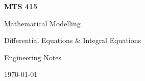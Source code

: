\documentclass[12pt, a4paper]{book}
\newcommand{\subjectcode}{MTS 415}
\newcommand{\subjecttitle}{Mathematical Modelling}
\newcommand{\subjectsubtitle}{Differential Equations \& Integral Equations}
\begin{document}
\begin{titlepage}
  \centering
  \vspace*{3cm}
  {\Huge\bfseries \subjectcode \par}
  \vspace{0.5em}
  {\LARGE \subjecttitle \par}
  \vspace{0.3em}
  {\large \subjectsubtitle \par}
  \vfill
  {\large Engineering Notes \par}
  \vspace{0.5em}
  {\normalsize \today \par}
\end{titlepage}

\tableofcontents
\newpage











\end{document}

